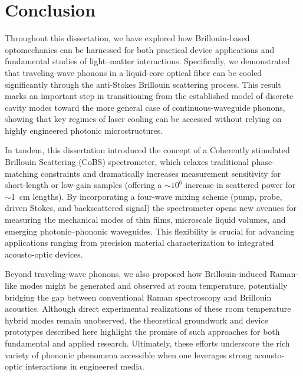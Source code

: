 \chapter{Conclusion}
\label{ch:Conclusion}
\acresetall

Throughout this dissertation, we have explored how Brillouin-based optomechanics can be harnessed for both practical device applications and fundamental studies of light–matter interactions. Specifically, we demonstrated that traveling-wave phonons in a liquid-core optical fiber can be cooled significantly through the anti-Stokes Brillouin scattering process. This result marks an important step in transitioning from the established model of discrete cavity modes toward the more general case of continuous-waveguide phonons, showing that key regimes of laser cooling can be accessed without relying on highly engineered photonic microstructures.

In tandem, this dissertation introduced the concept of a Coherently stimulated Brillouin Scattering (\acs{CoBS}) spectrometer, which relaxes traditional phase-matching constraints and dramatically increases measurement sensitivity for short-length or low-gain samples (offering a \(\sim\)\(10^{6}\) increase in scattered power for \(\sim\)\SI{1}{\centi\meter} lengths). By incorporating a four-wave mixing scheme (pump, probe, driven Stokes, and backscattered signal) the spectrometer opens new avenues for measuring the mechanical modes of thin films, microscale liquid volumes, and emerging photonic–phononic waveguides. This flexibility is crucial for advancing applications ranging from precision material characterization to integrated acousto-optic devices.

Beyond traveling-wave phonons, we also proposed how Brillouin-induced Raman-like modes might be generated and observed at room temperature, potentially bridging the gap between conventional Raman spectroscopy and Brillouin acoustics. Although direct experimental realizations of these room temperature hybrid modes remain unobserved, the theoretical groundwork and device prototypes described here highlight the promise of such approaches for both fundamental and applied research. Ultimately, these efforts underscore the rich variety of phononic phenomena accessible when one leverages strong acousto-optic interactions in engineered media.

